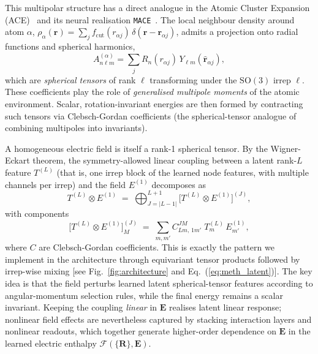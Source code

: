 \documentclass[aps,physrev,graphicx,amsmath,amssymb,
               reprint,superscriptaddress]{revtex4-2}
\begin{document}
This multipolar structure has a direct analogue in the Atomic Cluster Expansion (ACE)~\cite{drautz-2019-ace} and its neural realisation \texttt{MACE}~\cite{batatia-2022-mace}. The local neighbour density around atom $\alpha$, $\rho_\alpha(\mathbf r)=\sum_{j} f_\text{cut}(r_{\alpha j})\,\delta(\mathbf r-\mathbf r_{\alpha j})$, admits a projection onto radial functions and spherical harmonics,
\begin{equation}
A^{(\alpha)}_{n\ell m}=\sum_{j} R_n(r_{\alpha j})\,Y_{\ell m}(\hat{\mathbf r}_{\alpha j}),
\end{equation}
which are \emph{spherical tensors} of rank $\ell$ transforming under the $\mathrm{SO}(3)$ irrep $\ell$. These coefficients play the role of \emph{generalised multipole moments} of the atomic environment. Scalar, rotation-invariant energies are then formed by contracting such tensors via Clebsch-Gordan coefficients (the spherical-tensor analogue of combining multipoles into invariants).

A homogeneous electric field is itself a rank-1 spherical tensor. By the Wigner-Eckart theorem, the symmetry-allowed linear coupling between a latent rank-$L$ feature $T^{(L)}$ (that is, one irrep block of the learned node features, with multiple channels per irrep) and the field $E^{(1)}$ decomposes as
\begin{equation}
T^{(L)} \otimes E^{(1)} \;=\; \bigoplus_{J=|L-1|}^{L+1} \big[T^{(L)} \otimes E^{(1)}\big]^{(J)} ,
\label{eq:CG-sum}
\end{equation}
with components
\begin{equation}
\big[T^{(L)} \otimes E^{(1)}\big]^{(J)}_{M}
  \;=\;
  \sum_{m,m'}
  C^{J M}_{L m,\,1 m'}\;
  T^{(L)}_{m}\, E^{(1)}_{m'} ,
\label{eq:CG-components}
\end{equation}
where $C$ are Clebsch-Gordan coefficients. This is exactly the pattern we implement in the architecture through equivariant tensor products followed by irrep-wise mixing [see Fig.~\ref{fig:architecture} and Eq.~(\ref{eq:meth_latent})]. The key idea is that the field perturbs learned latent spherical-tensor features according to angular-momentum selection rules, while the final energy remains a scalar invariant. Keeping the coupling \emph{linear} in $\mathbf E$ realises latent linear response; nonlinear field effects are nevertheless captured by stacking interaction layers and nonlinear readouts, which together generate higher-order dependence on $\mathbf E$ in the learned electric enthalpy $\mathcal F(\{\mathbf R\},\mathbf E)$.
\end{document}
